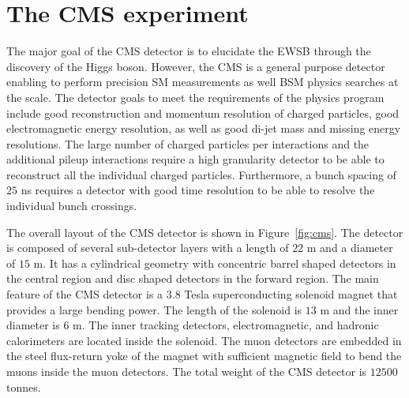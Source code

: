 \chapter{The CMS experiment}
The major goal of the CMS detector is to elucidate the EWSB through the discovery of the Higgs boson. However, the CMS is a general purpose detector enabling to perform precision SM measurements as well BSM physics searches at the \TeV scale. The detector goals to meet the requirements of the physics program include good reconstruction and momentum resolution of charged particles, good electromagnetic energy resolution, as well as good di-jet mass and missing energy resolutions. The large number of charged particles per interactions and the additional pileup interactions require a high granularity detector to be able to reconstruct all the individual charged particles.  Furthermore, a bunch spacing of $25$ ns requires a detector with good time resolution to be able to resolve the individual bunch crossings.  

The overall layout of the CMS detector is shown in Figure~\ref{fig:cms}. The detector is composed of several sub-detector layers with a length of $22$ m and a diameter of $15$ m. It has a cylindrical geometry with concentric barrel shaped detectors in the central region and disc shaped detectors in the forward region. The main feature of the CMS detector is a $3.8$ Tesla superconducting solenoid magnet that provides a large bending power. The length of the solenoid is $13$ m and the inner diameter is $6$ m. The inner tracking detectors, electromagnetic, and hadronic calorimeters are located inside the solenoid. The muon detectors are embedded in the steel flux-return yoke of the magnet with sufficient magnetic field to bend the muons inside the muon detectors. The total weight of the CMS detector is $12500$ tonnes.  

